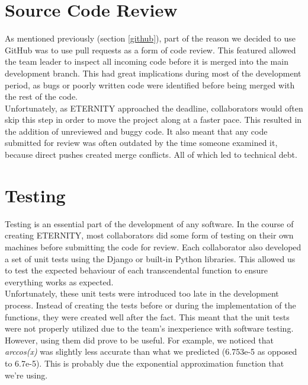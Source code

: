 \documentclass[11pt,onside]{report}
\begin{document}
\section{Source Code Review}

As mentioned previously (section \ref{github}), part of the reason we decided to use GitHub was to use pull requests as a form of code review. This featured allowed the team leader to inspect all incoming code before it is merged into the main development branch. This had great implications during most of the development period, as bugs or poorly written code were identified before being merged with the rest of the code.  \\

Unfortunately, as ETERNITY approached the deadline, collaborators would often skip this step in order to move the project along at a faster pace. This resulted in the addition of unreviewed and buggy code. It also meant that any code submitted for review was often outdated by the time someone examined it, because direct pushes created merge conflicts. All of which led to technical debt. \cite{technical-debt}

\section{Testing}

Testing is an essential part of the development of any software. In the course of creating ETERNITY, most collaborators did some form of testing on their own machines before submitting the code for review. Each collaborator also developed a set of unit tests using the Django or built-in Python libraries. This allowed us to test the expected behaviour of each transcendental function to ensure everything works as expected. \\

Unfortunately, these unit tests were introduced too late in the development process. Instead of creating the tests before or during the implementation of the functions, they were created well after the fact. This meant that the unit tests were not properly utilized due to the team's inexperience with software testing. \\

However, using them did prove to be useful. For example, we noticed that \textit{arccos(x)} was slightly less accurate than what we predicted (6.753e-5 as opposed to 6.7e-5). This is probably due the exponential approximation function that 
we're using. \\
\end{document}

